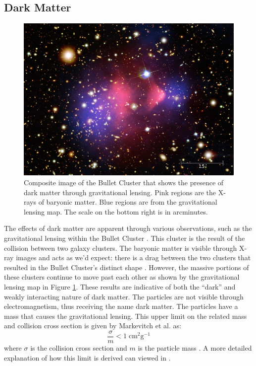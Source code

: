 \documentclass[../thesis.tex]{subfiles}
\begin{document}
\subsection{Dark Matter} \label{subsec:DM}
\begin{figure}[t]
	\centering
	\includegraphics[width=0.8\linewidth]{figures/bullet-cluster.jpg}
	\caption{
	Composite image of the Bullet Cluster that shows the presence of dark matter through gravitational lensing.
	Pink regions are the X-rays of baryonic matter.
	Blue regions are from the gravitational lensing map.
	The scale on the bottom right is in arcminutes. \cite{Bullet-Image}
	}
	\label{fig:bullet-cluster}
\end{figure}
The effects of dark matter are apparent through various observations, such as the gravitational lensing within the Bullet Cluster \cite{Bullet}.
This cluster is the result of the collision between two galaxy clusters.
The baryonic matter is visible through X-ray images and acts as we'd expect: there is a drag between the two clusters that resulted in the Bullet Cluster's distinct shape \cite{Bullet}.
However, the massive portions of these clusters continue to move past each other as shown by the gravitational lensing map in Figure \ref{fig:bullet-cluster}.
These results are indicative of both the ``dark'' and weakly interacting nature of dark matter.
The particles are not visible through electromagnetism, thus receiving the name dark matter.
The particles have a mass that causes the gravitational lensing.
This upper limit on the related mass and collision cross section is given by Markevitch et al. \cite{Bullet} as:
\begin{equation} \label{eq:DM-Mass-Lim}
	\frac{\sigma}{m} < 1 \; \text{cm}^2 \text{g}^{-1}
\end{equation}
where $\sigma$ is the collision cross section and $m$ is the particle mass \cite{Bullet}.
A more detailed explanation of how this limit is derived can viewed in \cite{Bullet}.
\end{document}
